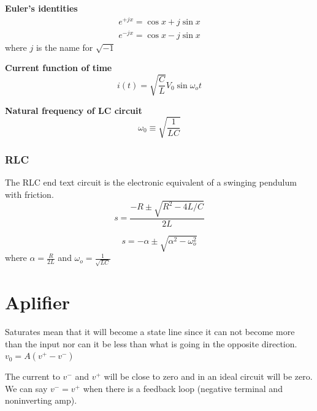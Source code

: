 \noindent\textbf{Euler's identities}
\begin{align*}
  e^{+jx} = \cos{x} + j\sin{x} \\
  e^{-jx} = \cos{x} - j\sin{x}
\end{align*}
where $j$ is the name for $\sqrt{-1}$

\noindent\textbf{Current function of time}
\begin{equation}
  i(t)=\sqrt{\frac{C}{L}}V_0\sin \omega_o t
\end{equation}

\noindent\textbf{Natural frequency of LC circuit}
\begin{equation}
  \omega_0 \equiv  \sqrt{\frac{1}{LC}}
\end{equation}


\subsubsection{RLC}
The RLC end text circuit is the electronic equivalent of a swinging pendulum with friction.
\begin{equation}
  s = \frac{-R\pm\sqrt{R^2-4L/C}}{2L}
\end{equation}

\begin{equation}
  s = -\alpha  \pm \sqrt{\alpha^2 - \omega^2_o}
\end{equation}
where $\alpha=\frac{R}{2L}$ and $\omega_o=\frac{1}{\sqrt{LC}}$

\newpage
\section{Aplifier}
Saturates mean that it will become a state line since it can not become more than the input nor can it be less than what is going in the opposite direction.
$v_0=A(v^+-v^-)$ \newline

The current to $v^-$ and $v^+$ will be close to zero and in an ideal circuit will
be zero. \newline
We can say $v^- = v^+$ when there is a feedback loop (negative terminal and noninverting amp). 

